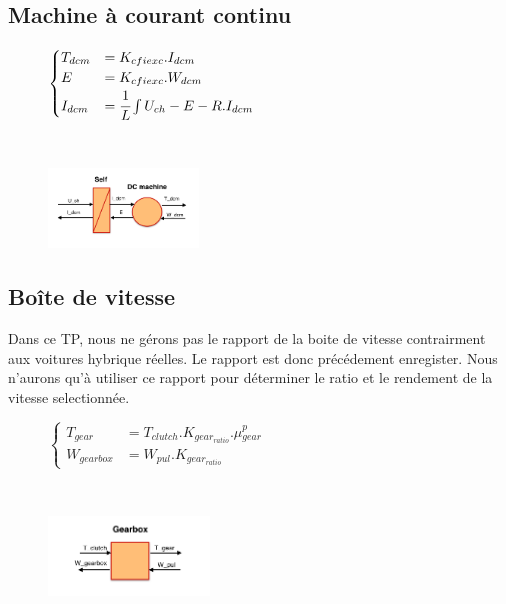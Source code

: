\subsection{Machine à courant continu}
\vspace{-10px}
\begin{figure}[ht]
\centering
\begin{minipage}{.5\textwidth}  
\centering
$\begin{cases}
	 T_{dcm} &= K_{cfiexc}.I_{dcm}\\
	E &= K_{cfiexc}.W_{dcm}\\
	I_{dcm} &= \cfrac{1}{L}\int{U_{ch}-E-R.I_{dcm}}	
\end{cases}$
\end{minipage}~
\begin{minipage}{.5\textwidth}
  \centering
\includegraphics[height=80px]{images/MCC.png}
\end{minipage}
\end{figure}
\FloatBarrier
\vspace{-20px}

\subsection{Boîte de vitesse}
Dans ce TP, nous ne gérons pas le rapport de la boite de vitesse contrairment aux voitures hybrique réelles. Le rapport est donc précédement enregister. Nous n'aurons qu'à utiliser ce rapport pour déterminer le ratio et le rendement de la vitesse selectionnée. 
\vspace{-10px}
\begin{figure}[ht]
\centering
\begin{minipage}{.5\textwidth}  
\centering
$\begin{cases}
	 T_{gear} &= T_{clutch}.K_{gear_{ratio}}.\mu{}_{gear}^{p}\\
	W_{gearbox} &= W_{pul}.K_{gear_{ratio}}
\end{cases}$
\end{minipage}~
\begin{minipage}{.5\textwidth}
  \centering
\includegraphics[height=80px]{images/Gearbox.png}
\end{minipage}
\end{figure}
\FloatBarrier
\vspace{-20px}

